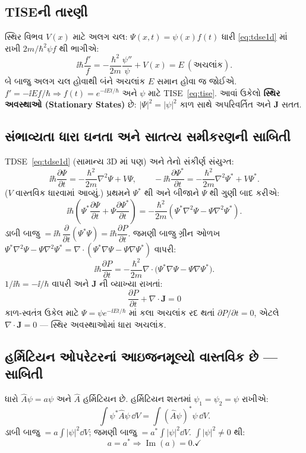 \subsection{TISEની તારણી}
સ્થિર વિભવ $V(x)$ માટે અલગ ચલ: $\Psi(x,t)=\psi(x)f(t)$ ધારી \eqref{eq:tdse1d} માં રાખી $2m/\hbar^2\psi f$ થી ભાગીએ:
\[
\ii\hbar\frac{f'}{f}=-\frac{\hbar^{2}}{2m}\frac{\psi''}{\psi}+V(x)=E\ (\text{અચલાંક}).
\]
બે બાજુ અલગ ચલ હોવાથી બંને અચલાંક $E$ સમાન હોવા જ જોઈએ. $f'=-\ii Ef/\hbar\Rightarrow f(t)=e^{-\ii Et/\hbar}$ અને $\psi$ માટે TISE~\eqref{eq:tise}. આવાં ઉકેલો \textbf{સ્થિર અવસ્થાઓ (Stationary States)} છે: $|\Psi|^{2}=|\psi|^{2}$ કાળ સાથે અપરિવર્તિત અને $\mathbf{J}$ સતત.

\subsection{સંભાવ્યતા ધારા ઘનતા અને સાતત્ય સમીકરણની સાબિતી}
\label{sec:continuity}
TDSE~\eqref{eq:tdse1d} (સામાન્ય 3D માં પણ) અને તેનો સંકીર્ણ સંયુગ્ત:
\[
\ii\hbar\frac{\partial\Psi}{\partial t}=-\frac{\hbar^{2}}{2m}\nabla^{2}\Psi+V\Psi,
\qquad
-\ii\hbar\frac{\partial\Psi^{*}}{\partial t}=-\frac{\hbar^{2}}{2m}\nabla^{2}\Psi^{*}+V\Psi^{*}.
\]
($V$ વાસ્તવિક ધારવામાં આવ્યું.) પ્રથમને $\Psi^{*}$ થી અને બીજાને $\Psi$ થી ગુણી બાદ કરીએ:
\[
\ii\hbar\left(\Psi^{*}\frac{\partial\Psi}{\partial t}+\Psi\frac{\partial\Psi^{*}}{\partial t}\right)
=-\frac{\hbar^{2}}{2m}\left(\Psi^{*}\nabla^{2}\Psi-\Psi\nabla^{2}\Psi^{*}\right).
\]
ડાબી બાજુ $= \ii\hbar\,\dfrac{\partial}{\partial t}(\Psi^{*}\Psi)=\ii\hbar\dfrac{\partial P}{\partial t}$.
જમણી બાજુ ગ્રીન ઓળખ $\Psi^{*}\nabla^{2}\Psi-\Psi\nabla^{2}\Psi^{*}=\nabla\cdot(\Psi^{*}\nabla\Psi-\Psi\nabla\Psi^{*})$ વાપરી:
\[
\ii\hbar\frac{\partial P}{\partial t}
=-\frac{\hbar^{2}}{2m}\nabla\cdot\big(\Psi^{*}\nabla\Psi-\Psi\nabla\Psi^{*}\big).
\]
$1/\ii\hbar=-\ii/\hbar$ વાપરી અને $\mathbf{J}$ ની વ્યાખ્યા રાખતાં:
\[
\boxed{\;\frac{\partial P}{\partial t}+\nabla\cdot\mathbf{J}=0\;}
\]
કાળ-સ્વતંત્ર ઉકેલ માટે $\Psi=\psi e^{-\ii Et/\hbar}$ માં કલા અચલાંક રદ થતાં $\partial P/\partial t=0$, એટલે $\nabla\cdot\mathbf J=0$ — સ્થિર અવસ્થાઓમાં ધારા અચલાંક.

\subsection{હર્મિટિયન ઓપરેટરનાં આઇજનમૂલ્યો વાસ્તવિક છે — સાબિતી}
ધારો $\hat A\psi=a\psi$ અને $\hat A$ હર્મિટિયન છે. હર્મિટિયન શરતમાં $\psi_1=\psi_2=\psi$ રાખીએ:
\[
\int\psi^{*}\hat A\psi\,\dd V=\int(\hat A\psi)^{*}\psi\,\dd V .
\]
ડાબી બાજુ $=a\int|\psi|^{2}\dd V$; જમણી બાજુ $=a^{*}\int|\psi|^{2}\dd V$. $\int|\psi|^2\neq0$ થી:
\[
a=a^{*}\Rightarrow\operatorname{Im}(a)=0 . \checkmark
\]

